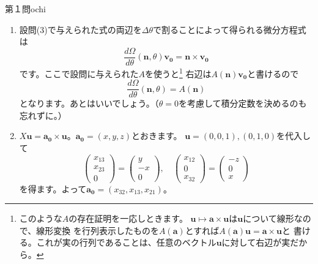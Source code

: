 \begin{answer}{第１問}{ochi}
\begin{enumerate}
  （式変形が少しややこしかったかもしれませんが、この解答は本質的には「一般の回転軸のまわりで
  $\theta \to \theta+\Delta \theta$」だとめんどいから、$z$軸まわりで$\theta=0$にしちゃえ、って
  してるだけです。）\\

\item
  設問(3)で与えられた式の両辺を$\Delta \theta$で割ることによって得られる微分方程式は
  \begin{equation}
    \frac{d \Omega}{d \theta}(\mathbf{n}, \theta) \mathbf{v_0}
    =\mathbf{n}\times \mathbf{v_0}
  \end{equation}
  です。ここで設問に与えられた$A$を使うと\footnote{このような$A$の存在証明を一応しときます。
  $\mathbf{u}\mapsto \mathbf{a}\times\mathbf{u}$は$\mathbf{u}$について線形なので、線形変換
  を行列表示したものを$A(\mathbf{a})$とすれば$A(\mathbf{a})\mathbf{u}=\mathbf{a}\times \mathbf{u}$と
  書ける。これが実の行列であることは、任意のベクトル$\mathbf{u}$に対して右辺が実だから。}
  右辺は$A(\mathbf{n})\mathbf{v_0}$と書けるので
  \begin{equation}
    \frac{d \Omega}{d \theta}(\mathbf{n}, \theta)=A(\mathbf{n})
  \end{equation}
  となります。あとはいいでしょう。（$\theta=0$を考慮して積分定数を決めるのも忘れずに。）

\item
  $X\mathbf{u}=\mathbf{a_0}\times\mathbf{u}$。$\mathbf{a_0}=(x,y,z)$とおきます。
  $\mathbf{u}=(0,0,1),(0,1,0)$を代入して
  \begin{equation}
    \begin{pmatrix} x_{13} \\ x_{23} \\ 0 \end{pmatrix}
      = \begin{pmatrix} y \\ -x \\ 0 \end{pmatrix},\quad
    \begin{pmatrix} x_{12} \\ 0 \\ x_{32} \end{pmatrix}
      = \begin{pmatrix} -z \\ 0 \\ x \end{pmatrix}
  \end{equation}
  を得ます。よって$\mathbf{a_0}=(x_{32},x_{13},x_{21})$。


\end{enumerate}
\end{answer}
